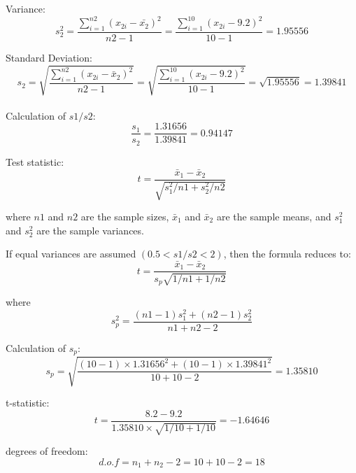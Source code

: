 \documentclass[a4paper,11pt,openright]{report}
\begin{document}
\begin{enumerate}
\hspace*{10mm} Variance:
\begin{equation*}
s_{2}^{2} = \frac{\sum\limits_{i=1}^{n2} (x_{2i} - \bar {x_{2}})^{2}}{n2 - 1}
= \frac{\sum\limits_{i=1}^{10} (x_{2i} - 9.2)^{2}}{10 -1} = 1.95556
\end{equation*}

\hspace*{10mm} Standard Deviation:
\begin{equation*}
s_{2} = \sqrt{\frac{\sum\limits_{i=1}^{n2} (x_{2i} - \bar x_{2})^{2}}{n2 - 1}}
= \sqrt{\frac{\sum\limits_{i=1}^{10} (x_{2i} - 9.2)^{2}}{10 -1}}
= \sqrt{1.95556} = 1.39841
\end{equation*} \\

Calculation of $s1/s2$:
\begin{equation*}
\frac{s_{1}}{s_{2}} = \frac{1.31656}{1.39841} = 0.94147
\end{equation*}

Test statistic: 
\begin{equation*}
t = \frac{\bar x_{1} - \bar x_{2}}{\sqrt{s_{1}^{2}/n1 + s_{2}^{2}/n2}}
\end{equation*}

where $n1$ and $n2$ are the sample sizes, $\bar x_{1}$ and $\bar x_{2}$ are the sample
means, and $s_{1}^{2}$ and $s_{2}^{2}$ are the sample variances. 

If equal variances are assumed $(0.5 < s1/s2 < 2)$, then the formula reduces to:
\begin{equation*}
t = \frac{\bar x_{1} - \bar x_{2}}{s_{p} \sqrt{1/n1 + 1/n2}}
\end{equation*}

where
\begin{equation*}
s_{p}^{2} = \frac{(n1-1)s_{1}^{2} + (n2-1)s_{2}^{2}}{n1+n2-2}
\end{equation*}

Calculation of $s_{p}$:
\begin{equation*}
s_{p} = \sqrt{\frac{(10-1) \times 1.31656^{2} + (10-1) \times 1.39841^{2}}{10+10-2}} 
      = 1.35810
\end{equation*}

t-statistic:
\begin{equation*}
t = \frac{8.2 - 9.2}{1.35810 \times \sqrt{1/10 + 1/10}} = -1.64646
\end{equation*}

degrees of freedom:
\begin{equation*}
d.o.f = n_{1} + n_{2} - 2 = 10 + 10 - 2 = 18
\end{equation*}


\end{enumerate}
\end{document}
